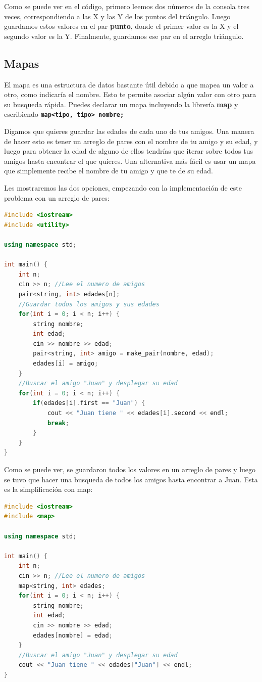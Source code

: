 \documentclass{article}
\begin{document}
Como se puede ver en el código, primero leemos dos números de la consola tres veces, correspondiendo a las X y las Y de los puntos del triángulo. Luego guardamos estos valores en el par \textbf{punto}, donde el primer valor es la X y el segundo valor es la Y. Finalmente, guardamos ese par en el arreglo triángulo.

\subsection{Mapas}

El mapa es una estructura de datos bastante útil debido a que mapea un valor a otro, como indicaría el nombre. Esto te permite asociar algún valor con otro para su busqueda rápida. Puedes declarar un mapa incluyendo la librería \textbf{map} y escribiendo \textbf{\lstinline{map<tipo, tipo> nombre;}}

Digamos que quieres guardar las edades de cada uno de tus amigos. Una manera de hacer esto es tener un arreglo de pares con el nombre de tu amigo y su edad, y luego para obtener la edad de alguno de ellos tendrías que iterar sobre todos tus amigos hasta encontrar el que quieres. Una alternativa más fácil es usar un mapa que simplemente recibe el nombre de tu amigo y que te de su edad.

Les mostraremos las dos opciones, empezando con la implementación de este problema con un arreglo de pares:

\begin{lstlisting}[language=C++, title=Implementación con pares]
#include <iostream>
#include <utility>

using namespace std;

int main() {
	int n;
	cin >> n; //Lee el numero de amigos
	pair<string, int> edades[n];
	//Guardar todos los amigos y sus edades
	for(int i = 0; i < n; i++) {
		string nombre;
		int edad;
		cin >> nombre >> edad;
		pair<string, int> amigo = make_pair(nombre, edad);
		edades[i] = amigo;
	}
	//Buscar el amigo "Juan" y desplegar su edad
	for(int i = 0; i < n; i++) {
		if(edades[i].first == "Juan") {
			cout << "Juan tiene " << edades[i].second << endl;
			break;
		}
	}
}
\end{lstlisting}

Como se puede ver, se guardaron todos los valores en un arreglo de pares y luego se tuvo que hacer una busqueda de todos los amigos hasta encontrar a Juan. Esta es la simplificación con map:

\begin{lstlisting}[language=C++, title=Implementación con map]
#include <iostream>
#include <map>

using namespace std;

int main() {
	int n;
	cin >> n; //Lee el numero de amigos
	map<string, int> edades;
	for(int i = 0; i < n; i++) {
		string nombre;
		int edad;
		cin >> nombre >> edad;
		edades[nombre] = edad;
	}
	//Buscar el amigo "Juan" y desplegar su edad
	cout << "Juan tiene " << edades["Juan"] << endl;
}
\end{lstlisting}
\end{document}
